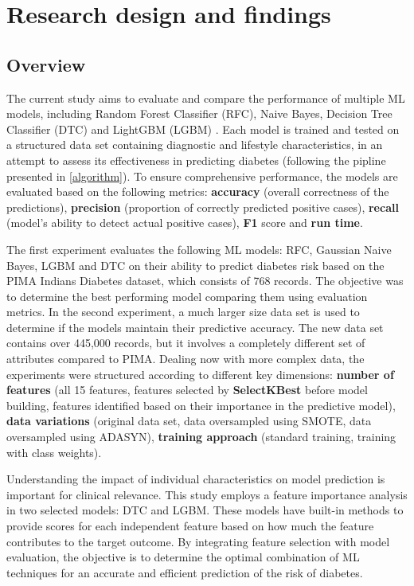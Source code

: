 \documentclass[runningheads]{llncs}
\begin{document}
\section{Research design and findings}
\label{section:proposedApproach}

\subsection{Overview}

The current study aims to evaluate and compare the performance of multiple ML models, including Random Forest Classifier (RFC), Naive Bayes, Decision Tree Classifier (DTC) and LightGBM (LGBM) \cite{aurelien2019hands}.  
Each model is trained and tested on a structured data set containing diagnostic and lifestyle characteristics, in an attempt to assess its effectiveness in predicting diabetes (following the pipline presented in \autoref{algorithm}). 
To ensure comprehensive performance, the models are evaluated based on the following metrics: \textbf{accuracy} (overall correctness of the predictions), \textbf{ precision} (proportion of correctly predicted positive cases),  \textbf{recall} (model's ability to detect actual positive cases), \textbf{F1} score and   \textbf{run time}.

The first experiment evaluates the following ML models: RFC, Gaussian Naive Bayes, LGBM and DTC on their ability to predict diabetes risk based on the PIMA Indians Diabetes dataset, which consists of 768 records. The objective was to determine the best performing model comparing them using evaluation metrics. 
In the second experiment, a much larger size data set is used to determine if the models maintain their predictive accuracy. The new data set contains over 445,000 records, but it involves a completely different set of attributes compared to PIMA. Dealing now with more complex data, the experiments were structured according to different key dimensions:  \textbf{number of features} (all 15 features, features selected by \textbf{SelectKBest} before model building, features identified based on their importance in the predictive model), 
\textbf{data variations} (original data set, data oversampled using SMOTE, data oversampled using ADASYN), 
\textbf{training approach} (standard training, training with class weights).


Understanding the impact of individual characteristics on model prediction is important for clinical relevance. This study employs a feature importance analysis in two selected models: DTC and LGBM. These models have built-in methods to provide scores for each independent feature based on how much the feature contributes to the target outcome. 
By integrating feature selection with model evaluation, the objective is to determine the optimal combination of ML techniques for an accurate and efficient prediction of the risk of diabetes.
\end{document}
